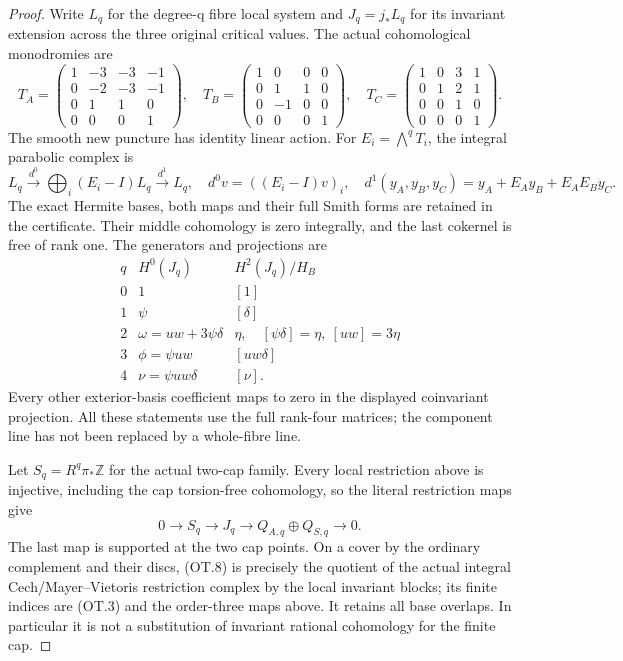 \begin{proof}
Write \(L_q\) for the degree-q fibre local system and \(J_q=j_*L_q\) for its
invariant extension across the three original critical values. The
actual cohomological monodromies are
\[
 T_A=\begin{pmatrix}1&-3&-3&-1\\0&-2&-3&-1\\0&1&1&0\\0&0&0&1\end{pmatrix},
 \quad T_B=\begin{pmatrix}1&0&0&0\\0&1&1&0\\0&-1&0&0\\0&0&0&1\end{pmatrix},
 \quad T_C=\begin{pmatrix}1&0&3&1\\0&1&2&1\\0&0&1&0\\0&0&0&1\end{pmatrix}.
                                                               \tag{OT.5}
\]
The smooth new puncture has identity linear action. For \(E_i=\bigwedge^q T_i\),
the integral parabolic complex is
\[
 L_q\xrightarrow{d^0}\bigoplus_i(E_i-I)L_q
       \xrightarrow{d^1}L_q,
 \quad d^0v=((E_i-I)v)_i,
 \quad d^1(y_A,y_B,y_C)=y_A+E_Ay_B+E_AE_By_C.             \tag{OT.6}
\]
The exact Hermite bases, both maps and their full Smith forms are retained
in the certificate. Their middle cohomology is zero integrally, and the
last cokernel is free of rank one. The generators and projections are
\[
\begin{array}{c|c|c}
q&H^0(J_q)&H^2(J_q)/H_B\\\hline
0&1&[1]\\
1&\psi&[\delta]\\
2&\omega=uw+3\psi\delta&\eta,\quad[\psi\delta]=\eta,\ [uw]=3\eta\\
3&\phi=\psi uw&[uw\delta]\\
4&\nu=\psi uw\delta&[\nu].
\end{array}                                                   \tag{OT.7}
\]
Every other exterior-basis coefficient maps to zero in the displayed
coinvariant projection. All these statements use the full rank-four
matrices; the component line has not been replaced by a whole-fibre line.

Let \(S_q=R^q\pi_*\mathbb Z\) for the actual two-cap family. Every local restriction
above is injective, including the cap torsion-free cohomology, so the
literal restriction maps give
\[
 0\longrightarrow S_q\longrightarrow J_q
   \longrightarrow Q_{A,q}\oplus Q_{S,q}\longrightarrow0.       \tag{OT.8}
\]
The last map is supported at the two cap points. On a cover by the
ordinary complement and their discs, (OT.8) is precisely the quotient of
the actual integral Cech/Mayer--Vietoris restriction complex by the local
invariant blocks; its finite indices are (OT.3) and the order-three maps
above. It retains all base overlaps. In particular it is not a substitution
of invariant rational cohomology for the finite cap.


\end{proof}
